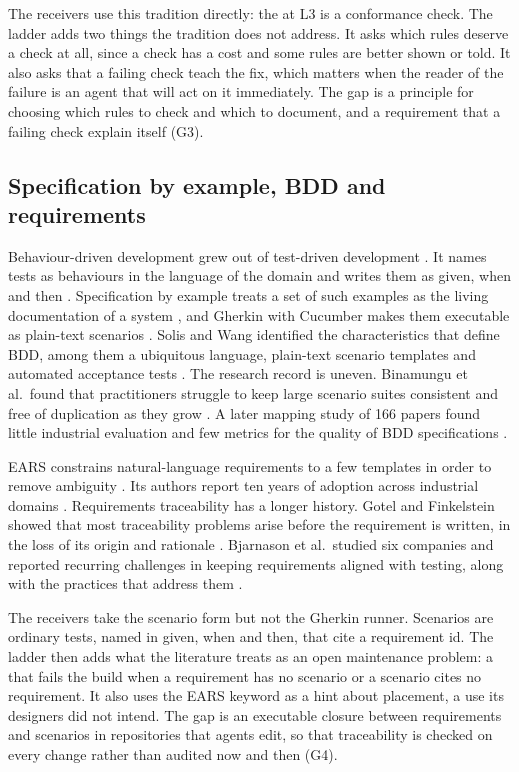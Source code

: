 The receivers use this tradition directly: the  at L3 is a
conformance check. The ladder adds two things the tradition does not address. It asks which
rules deserve a check at all, since a check has a cost and some rules are better shown or told.
It also asks that a failing check teach the fix, which matters when the reader of the failure
is an agent that will act on it immediately. The gap is a principle for choosing which rules to
check and which to document, and a requirement that a failing check explain itself (G3).

\subsection{Specification by example, BDD and requirements}

Behaviour-driven development grew out of test-driven development \citep{beck2003tdd}. It names
tests as behaviours in the language of the domain and writes them as given, when and then
\citep{north2006bdd}. Specification by example treats a set of such examples as the living
documentation of a system \citep{adzic2011sbe}, and Gherkin with Cucumber makes them executable
as plain-text scenarios \citep{wynne2012cucumber}. Solis and Wang identified the characteristics
that define BDD, among them a ubiquitous language, plain-text scenario templates and automated
acceptance tests \citep{solis2011bdd}. The research record is uneven. Binamungu et al.\ found
that practitioners struggle to keep large scenario suites consistent and free of duplication as
they grow \citep{binamungu2018maintaining}. A later mapping study of 166 papers found little
industrial evaluation and few metrics for the quality of BDD specifications
\citep{binamungu2023mapping}.

EARS constrains natural-language requirements to a few templates in order to remove ambiguity
\citep{mavin2009ears}. Its authors report ten years of adoption across industrial domains
\citep{mavin2019tenyears}. Requirements traceability has a longer history. Gotel and Finkelstein
showed that most traceability problems arise before the requirement is written, in the loss of
its origin and rationale \citep{gotel1994traceability}. Bjarnason et al.\ studied six companies
and reported recurring challenges in keeping requirements aligned with testing, along with the
practices that address them \citep{bjarnason2014alignment}.

The receivers take the scenario form but not the Gherkin runner. Scenarios are ordinary tests,
named in given, when and then, that cite a requirement id. The ladder then adds what the
literature treats as an open maintenance problem: a  that fails the build
when a requirement has no scenario or a scenario cites no requirement. It also uses the EARS
keyword as a hint about placement, a use its designers did not intend. The gap is an executable
closure between requirements and scenarios in repositories that agents edit, so that
traceability is checked on every change rather than audited now and then (G4).

